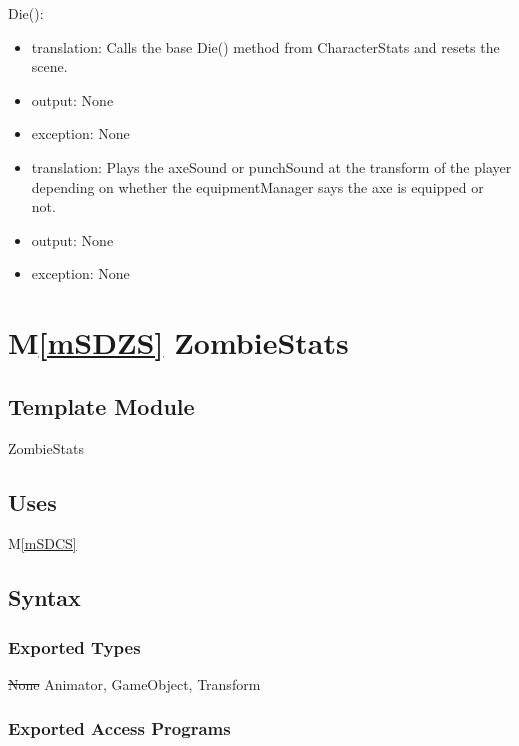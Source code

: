 \documentclass[12pt]{article}
\newcommand{\mref}[1]{M\ref{#1}}
\begin{document}
\noindent Die():
\begin{itemize}
\item translation: Calls the base Die() method from CharacterStats and resets the scene.
\item output: None
\item exception: None
\end{itemize}

\begin{itemize}
\item {\color{magenta} translation: Plays the axeSound or punchSound at the transform of the player depending on whether the equipmentManager says the axe is equipped or not.}
\item{\color{magenta}  output: None}
\item {\color{magenta} exception: None}
\end{itemize}

\newpage

\section* {\mref{mSDZS} ZombieStats}

\subsection*{Template Module}

ZombieStats

\subsection* {Uses}

\mref{mSDCS}

\subsection* {Syntax}

\subsubsection* {Exported Types}

\sout{None} 
{\color{magenta} Animator, GameObject, Transform}

\subsubsection* {Exported Access Programs}
\end{document}
